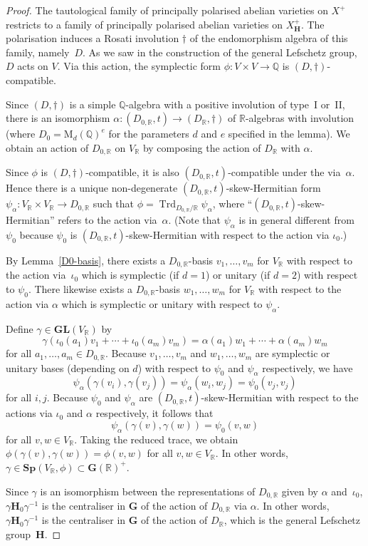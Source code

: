 \documentclass[11pt]{article}
\numberwithin{equation}{section}
\newcommand{\bQ}{\mathbb{Q}}
\newcommand{\bR}{\mathbb{R}}
\newcommand{\gG}{\mathbf{G}}
\newcommand{\gGL}{\mathbf{GL}}
\newcommand{\gH}{\mathbf{H}}
\newcommand{\gSp}{\mathbf{Sp}}
\newcommand{\rM}{\mathrm{M}}
\DeclareMathOperator{\Trd}{Trd}
\begin{document}
\begin{proof}
The tautological family of principally polarised abelian varieties on $X^+$ restricts to a family of principally polarised abelian varieties on $X_\gH^+$.
The polarisation induces a Rosati involution $\dag$ of the endomorphism algebra of this family, namely~$D$.
As we saw in the construction of the general Lefschetz group, $D$ acts on $V$.
Via this action, the symplectic form $\phi \colon V \times V \to \bQ$ is $(D,\dag)$-compatible.

Since $(D,\dag)$ is a simple $\bQ$-algebra with a positive involution of type~I or~II, there is an isomorphism $\alpha \colon (D_{0,\bR},t) \to (D_\bR,\dag)$ of $\bR$-algebras with involution (where $D_0 = \rM_d(\bQ)^e$ for the parameters $d$ and $e$ specified in the lemma).
We obtain an action of $D_{0,\bR}$ on $V_\bR$ by composing the action of $D_\bR$ with $\alpha$.

Since $\phi$ is $(D,\dag)$-compatible, it is also $(D_{0,\bR},t)$-compatible under the via~$\alpha$.
Hence there is a unique non-degenerate $(D_{0,\bR},t)$-skew-Hermitian form $\psi_\alpha \colon V_\bR \times V_\bR \to D_{0,\bR}$ such that $\phi = \Trd_{D_{0,\bR}/\bR} \psi_\alpha$, where ``$(D_{0,\bR},t)$-skew-Hermitian'' refers to the action via~$\alpha$.
(Note that $\psi_\alpha$ is in general different from $\psi_0$ because $\psi_0$ is $(D_{0,\bR},t)$-skew-Hermitian with respect to the action via $\iota_0$.)

By Lemma~\ref{D0-basis}, there exists a $D_{0,\bR}$-basis $v_1, \dotsc, v_m$ for $V_\bR$ with respect to the action via~$\iota_0$ which is symplectic (if $d=1$) or unitary (if $d=2$) with respect to $\psi_0$.
There likewise exists a $D_{0,\bR}$-basis $w_1, \dotsc, w_m$ for $V_\bR$ with respect to the action via $\alpha$ which is symplectic or unitary with respect to $\psi_\alpha$.

Define $\gamma \in \gGL(V_\bR)$ by
\[
\gamma(\iota_0(a_1)v_1 + \dotsb + \iota_0(a_m)v_m) = \alpha(a_1)w_1 + \dotsb + \alpha(a_m)w_m
\]
for all $a_1, \dotsc, a_m \in D_{0,\bR}$.
Because $v_1, \dotsc, v_m$ and $w_1, \dotsc, w_m$ are symplectic or unitary bases (depending on $d$) with respect to $\psi_0$ and $\psi_\alpha$ respectively, we have
\[
\psi_\alpha(\gamma(v_i), \gamma(v_j)) = \psi_\alpha(w_i, w_j) = \psi_0(v_j, v_j)
\]
for all $i, j$.
Because $\psi_0$ and $\psi_\alpha$ are $(D_{0,\bR},t)$-skew-Hermitian with respect to the actions via $\iota_0$ and $\alpha$ respectively, it follows that
\[
\psi_\alpha(\gamma(v), \gamma(w)) = \psi_0(v, w)
\]
for all $v, w \in V_\bR$.
Taking the reduced trace, we obtain $\phi(\gamma(v), \gamma(w)) = \phi(v, w)$ for all $v, w \in V_\bR$.
In other words, $\gamma \in \gSp(V_\bR, \phi) \subset \gG(\bR)^+$.

Since $\gamma$ is an isomorphism between the representations of $D_{0,\bR}$ given by $\alpha$ and~$\iota_0$, $\gamma \gH_0 \gamma^{-1}$ is the centraliser in $\gG$ of the action of $D_{0,\bR}$ via $\alpha$.
In other words, $\gamma \gH_0 \gamma^{-1}$ is the centraliser in $\gG$ of the action of $D_\bR$, which is the general Lefschetz group~$\gH$.
\end{proof}
\end{document}
